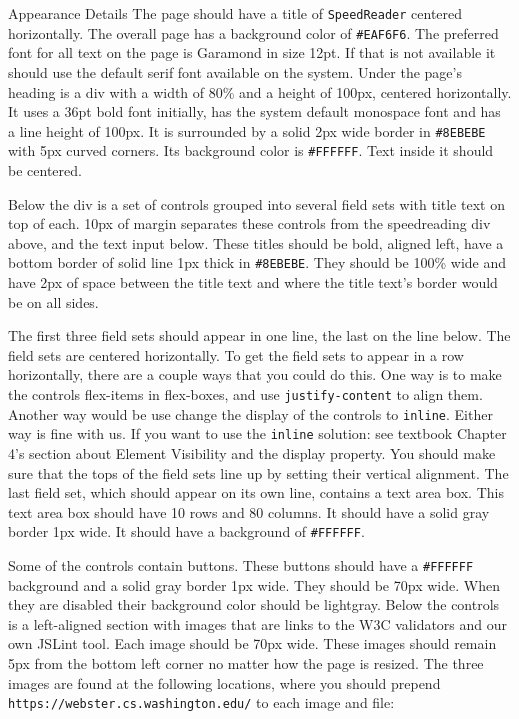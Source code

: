 \documentclass[programming]{../../mfcs}
\begin{document}
\begin{question}{Appearance Details}
  The page should have a title of \texttt{SpeedReader} centered horizontally. The overall page has a background color of
  \texttt{\#EAF6F6}. The preferred font for all text on the page is Garamond in size 12pt. If that is not available it should use
the default serif font available on the system.
Under the page's heading is a div with a width of 80\% and a height of 100px, centered horizontally. It uses a 36pt
bold font initially, has the system default monospace font and has a line height of 100px. It is surrounded by a solid
  2px wide border in \texttt{\#8EBEBE} with 5px curved corners. Its background color is
  \texttt{\#FFFFFF}. Text inside it should be
centered.
\newline

Below the div is a set of controls grouped into several field sets with title text on top of each. 10px of margin separates 
these controls from the speedreading div above, and the text input below. These titles should be bold, aligned left, have 
a bottom border of solid line 1px thick in \texttt{\#8EBEBE}. They should be 100\% wide and have 2px of space between the 
title text and where the title text’s border would be on all sides.
\newline

The first three field sets should appear in one line, the last on the line below. The field sets are centered horizontally.
To get the field sets to appear in a row horizontally, there are a couple ways that you could do this. One way is to make 
  the controls flex-items in flex-boxes, and use \texttt{justify-content} to align them. Another way would be use change the display 
of the controls to \texttt{inline}. Either way is fine with us. If you want to use the \texttt{inline} solution: see 
textbook Chapter 4's section about Element Visibility and the display property. You should make sure that the tops of the 
field sets line up by setting their vertical alignment.  The last field set, which should appear on its own line, contains 
a text area box. This text area box should have 10 rows and 80 columns. It should have a solid gray border 1px wide. It should
have a background of \texttt{\#FFFFFF}.
\newline

Some of the controls contain buttons. These buttons should have a \texttt{\#FFFFFF} background and a solid gray border 1px
wide. They should be 70px wide. When they are disabled their background color should be lightgray.
Below the controls is a left-aligned section with images that are links to the W3C validators and our own JSLint tool.
Each image should be 70px wide. These images should remain 5px from the bottom left corner no matter how the
page is resized. The three images are found at the following locations, where you should prepend
  \texttt{https://webster.cs.washington.edu/} to each image and file:
  \newline


\end{question}
\end{document}
